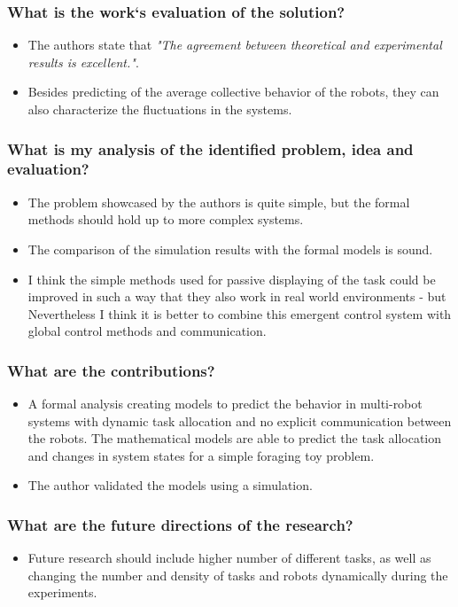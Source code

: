     \subsubsection*{What is the work`s evaluation of the solution?}
    \begin{itemize}
        \item The authors state that \emph{"The agreement between theoretical and experimental results is excellent."}. 
        \item Besides predicting of the average collective behavior of the robots, they can also characterize the fluctuations in the systems.
    \end{itemize}
    \subsubsection*{What is my analysis of the identified problem, idea and evaluation?}
    \begin{itemize}
        \item The problem showcased by the authors is quite simple, but the formal methods should hold up to more complex systems.
        \item The comparison of the simulation results with the formal models is sound. 
        \item I think the simple methods used for passive displaying of the task could be improved in such a way that they also work in real world environments - but Nevertheless I think it is better to combine this emergent control system with  global control methods and communication.
    \end{itemize}
    \subsubsection*{What are the contributions?}
    \begin{itemize}
        \item A formal analysis creating models to predict the behavior in multi-robot systems with dynamic task allocation and no explicit communication between the robots. The mathematical models are able to predict the task allocation and changes in system states for a simple foraging toy problem.
        \item The author validated the models using a simulation.
    \end{itemize}
    \subsubsection*{What are the future directions of the research?}
    \begin{itemize}
        \item Future research should include higher number of different tasks, as well as changing the number and density of tasks and robots dynamically during the experiments.
    \end{itemize}

